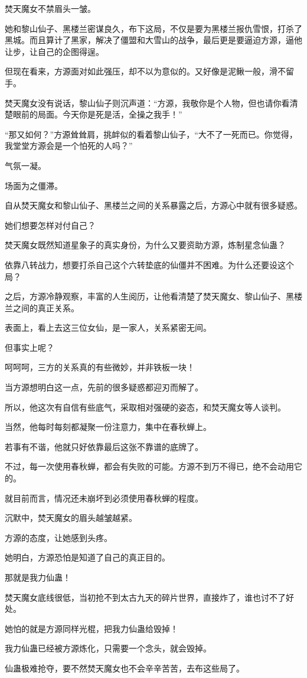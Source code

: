 \begin{this_body}
焚天魔女不禁眉头一皱。

她和黎山仙子、黑楼兰密谋良久，布下这局，不仅是要为黑楼兰报仇雪恨，打杀了黑城。而且算计了黑家，解决了僵盟和大雪山的战争，最后更是要逼迫方源，逼他让步，让自己的企图得逞。

但现在看来，方源面对如此强压，却不以为意似的。又好像是泥鳅一般，滑不留手。

焚天魔女没有说话，黎山仙子则沉声道：“方源，我敬你是个人物，但也请你看清楚眼前的局面。今天你是死是活，全操之我手！”

“那又如何？”方源耸耸肩，挑衅似的看着黎山仙子，“大不了一死而已。你觉得，我堂堂方源会是一个怕死的人吗？”

气氛一凝。

场面为之僵滞。

自从焚天魔女和黎山仙子、黑楼兰之间的关系暴露之后，方源心中就有很多疑惑。

她们想要怎样对付自己？

焚天魔女既然知道星象子的真实身份，为什么又要资助方源，炼制星念仙蛊？

依靠八转战力，想要打杀自己这个六转垫底的仙僵并不困难。为什么还要设这个局？

之后，方源冷静观察，丰富的人生阅历，让他看清楚了焚天魔女、黎山仙子、黑楼兰之间的真正关系。

表面上，看上去这三位女仙，是一家人，关系紧密无间。

但事实上呢？

呵呵呵，三方的关系真的有些微妙，并非铁板一块！

当方源想明白这一点，先前的很多疑惑都迎刃而解了。

所以，他这次有自信有些底气，采取相对强硬的姿态，和焚天魔女等人谈判。

当然，他每时每刻都凝聚一份注意力，集中在春秋蝉上。

若事有不谐，他就只好依靠最后这张不靠谱的底牌了。

不过，每一次使用春秋蝉，都会有失败的可能。方源不到万不得已，绝不会动用它的。

就目前而言，情况还未崩坏到必须使用春秋蝉的程度。

沉默中，焚天魔女的眉头越皱越紧。

方源的态度，让她感到头疼。

她明白，方源恐怕是知道了自己的真正目的。

那就是我力仙蛊！

焚天魔女底线很低，当初抢不到太古九天的碎片世界，直接炸了，谁也讨不了好处。

她怕的就是方源同样光棍，把我力仙蛊给毁掉！

我力仙蛊已经被方源炼化，只需要一个念头，就会毁掉。

仙蛊极难抢夺，要不然焚天魔女也不会辛辛苦苦，去布这些局了。

\end{this_body}

